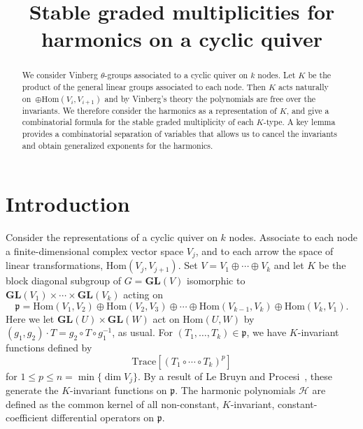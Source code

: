 \documentclass[ALCO,Unicode]{cedram}
\title[Graded Multiplicities]{Stable graded multiplicities for harmonics on a cyclic quiver}
\author[\initial{A.} Frohmader]{\firstname{Andrew} \lastname{Frohmader}}
\author[\initial{A.} Heaton]{\firstname{Alexander} \lastname{Heaton}}
\newcommand{\Ha}{\mathcal{H}}
\newcommand{\p}{\mathfrak{p}}
\newcommand{\GL}{\textbf{GL}}
\begin{document}
\begin{abstract}
  We consider Vinberg $\theta$-groups associated to a cyclic quiver on $k$ nodes. Let $K$ be the product of the general linear groups associated to each node. Then $K$ acts naturally on~$\oplus \text{Hom}(V_i, V_{i+1})$ and by Vinberg's theory the polynomials are free over the invariants. We therefore consider the harmonics as a representation of $K$, and give a combinatorial formula for the stable graded multiplicity of each $K$-type. A key lemma provides a combinatorial separation of variables that allows us to cancel the invariants and obtain generalized exponents for the harmonics.
\end{abstract}


\maketitle

\section{Introduction}

Consider the representations of a cyclic quiver on $k$ nodes. Associate to each node a finite-dimensional complex vector space $V_j$, and to each arrow the space of linear transformations, $\mbox{Hom}(V_j, V_{j+1})$.  Set $V = V_1 \oplus \cdots \oplus V_k$ and let $K$ be the block diagonal subgroup of $G=\GL(V)$ isomorphic to $\GL(V_1) \times \cdots \times \GL(V_k)$ acting on
\begin{equation*}
    \mathfrak p = \mbox{Hom}(V_1,V_2) \oplus \mbox{Hom}(V_2,V_3) \oplus \cdots \oplus \mbox{Hom}(V_{k-1}, V_k) \oplus \mbox{Hom}(V_k, V_1).
\end{equation*}
Here we let $\GL(U) \times \GL(W)$ act on $\mbox{Hom}(U,W)$ by $(g_1,g_2) \cdot T  = g_2 \circ T \circ g_1^{-1}$, as usual. For $(T_1, \dots, T_k) \in \mathfrak p$, we have $K$-invariant functions defined by
\begin{equation*}
    \text{Trace}\left[ (T_1 \circ \cdots \circ T_k)^p \right]
\end{equation*}
for $1 \leq p \leq n = \min \{\dim V_j \}$. By a result of Le Bruyn and Procesi~\cite{LeBryunProcesi1990}, these generate the $K$-invariant functions on $\mathfrak p$. The harmonic polynomials $\Ha$ are defined as the common kernel of all non-constant, $K$-invariant, constant-coefficient differential operators on $\p$. 
\end{document}
